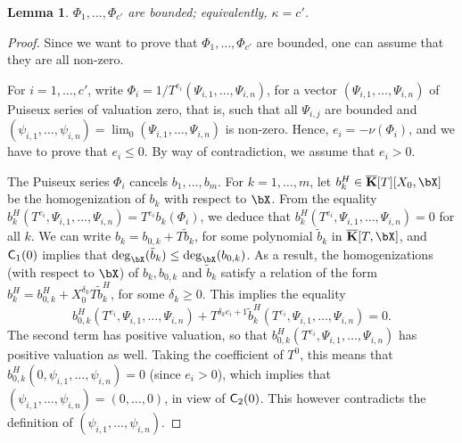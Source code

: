 \documentclass[12pt]{article}
\newtheorem{lemma}[definition]{Lemma}
\begin{document}
\begin{lemma}
   $\Phi_1,\dots,\Phi_{c'}$ are bounded; equivalently, $\kappa=c'$.
\end{lemma}
\begin{proof}
  Since we want to prove that $\Phi_1,\dots,\Phi_{c'}$ are bounded,
  one can assume that they are all non-zero.

  For $i=1,\dots,c'$, write
  $\Phi_i=1/T^{e_i} (\Psi_{i,1},\dots,\Psi_{i,n})$, for a vector
  $(\Psi_{i,1},\dots,\Psi_{i,n})$ of Puiseux series of valuation zero,
  that is, such that all $\Psi_{i,j}$ are bounded and
  $(\psi_{i,1},\dots,\psi_{i,n})=\lim_0(\Psi_{i,1},\dots,\Psi_{i,n})$
  is non-zero. Hence, $e_i=-\nu(\Phi_i)$, and we have to prove that
  $e_i \le 0$.  By way of contradiction, we assume that $e_i > 0$.

  The Puiseux series $\Phi_i$ cancels $b_1,\dots,b_m$. For
  $k=1,\dots,m$, let $b_k^H \in \KKbar[T][X_0,\bX]$ be the homogenization
  of $b_k$ with respect to $\bX$. From the equality
  $b_k^H(T^{e_i},\Psi_{i,1},\dots,\Psi_{i,n})=
  T^{e_i}b_k(\Phi_i)$, we deduce that
  $b_k^H(T^{e_i},\Psi_{i,1},\dots,\Psi_{i,n})=0$ for all $k$. We
  can write $b_k = b_{0,k} + T \tilde b_k$, for some polynomial
  $\tilde b_k$ in $\KKbar[T,\bX]$, and $\mathsf{C}_1(0)$ implies that
  $\deg_\bX(\tilde b_k) \le \deg_\bX(b_{0,k})$. As a result, the
  homogenizations (with respect to $\bX$) of $b_{k},b_{0,k}$ and $\tilde
  b_k$ satisfy a relation of the form $b^H_k = b_{0,k}^H +
  X_0^{\delta_k} T \tilde b^H_k$, for some $\delta_k \ge 0$. This
  implies the equality
  $$b_{0,k}^H(T^{e_i},\Psi_{i,1},\dots,\Psi_{i,n}) + T^{\delta_k
    e_i+1}\tilde b_k^H(T^{e_i},\Psi_{i,1},\dots,\Psi_{i,n})=0.$$
  The second term has positive valuation, so that
  $b_{0,k}^H(T^{e_i},\Psi_{i,1},\dots,\Psi_{i,n})$ has positive
  valuation as well. Taking the coefficient of $T^0$, this means 
  that $b_{0,k}^H(0,\psi_{i,1},\dots,\psi_{i,n})=0$ (since $e_i > 0$), which implies 
  that $(\psi_{i,1},\dots,\psi_{i,n})=(0,\dots,0)$, in view of $\mathsf{C}_2(0)$.
  This however contradicts the definition of $(\psi_{i,1},\dots,\psi_{i,n})$.
\end{proof}
\end{document}
